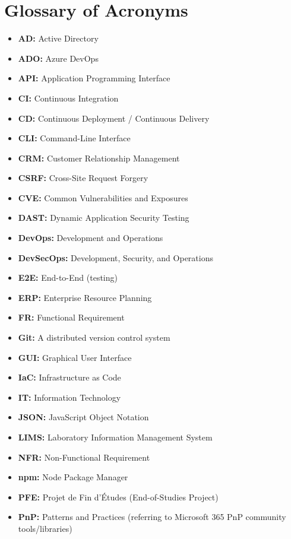 \chapter*{Glossary of Acronyms}
\begin{itemize}
    \item \textbf{AD:} Active Directory
    \item \textbf{ADO:} Azure DevOps
    \item \textbf{API:} Application Programming Interface
    \item \textbf{CI:} Continuous Integration
    \item \textbf{CD:} Continuous Deployment / Continuous Delivery
    \item \textbf{CLI:} Command-Line Interface
    \item \textbf{CRM:} Customer Relationship Management
    \item \textbf{CSRF:} Cross-Site Request Forgery
    \item \textbf{CVE:} Common Vulnerabilities and Exposures
    \item \textbf{DAST:} Dynamic Application Security Testing
    \item \textbf{DevOps:} Development and Operations
    \item \textbf{DevSecOps:} Development, Security, and Operations
    \item \textbf{E2E:} End-to-End (testing)
    \item \textbf{ERP:} Enterprise Resource Planning
    \item \textbf{FR:} Functional Requirement
    \item \textbf{Git:} A distributed version control system
    \item \textbf{GUI:} Graphical User Interface
    \item \textbf{IaC:} Infrastructure as Code
    \item \textbf{IT:} Information Technology
    \item \textbf{JSON:} JavaScript Object Notation
    \item \textbf{LIMS:} Laboratory Information Management System
    \item \textbf{NFR:} Non-Functional Requirement
    \item \textbf{npm:} Node Package Manager
    \item \textbf{PFE:} Projet de Fin d'Études (End-of-Studies Project)
    \item \textbf{PnP:} Patterns and Practices (referring to Microsoft 365 PnP community tools/libraries)

\end{itemize}
